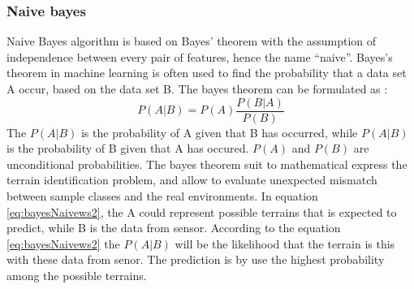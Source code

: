 \documentclass[USenglish]{ifimaster}  %
\begin{document}
	
	
\subsubsection{Naive bayes}
Naive Bayes algorithm is based on Bayes’ theorem with the assumption of independence between every pair of features, hence the name “naive”. Bayes's theorem in machine learning is often used to find the probability that a data set A occur, based on the data set B. The bayes theorem can be formulated as \cite{Press:2007:NRE:1403886}:
\begin{equation}
P(A \vert B) = P(A)\frac{P(B \vert A)}{P(B)}
\label{eq:bayesNaivews2}
\end{equation}
The $P(A \vert B)$ is the probability of A given that B has occurred, while $P(A \vert B)$ is the probability of B given that A has occured. $P(A)$ and $P(B)$ are unconditional probabilities. The bayes theorem suit to mathematical express the terrain identification problem, and allow to evaluate unexpected mismatch between sample classes and the real environments. In equation \ref{eq:bayesNaivews2}, the A could represent possible terrains that is expected to predict, while B is the data from sensor. According to the equation \ref{eq:bayesNaivews2} the $P(A \vert B)$ will be the likelihood that the terrain is this with these data from senor. The prediction is by use the highest probability among the possible terrains. 
	
\end{document}
